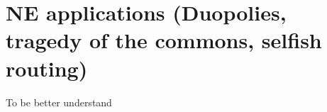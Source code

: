 \section{NE applications (Duopolies, tragedy of the commons, selfish routing)}
\begin{center}
    To be better understand
\end{center}